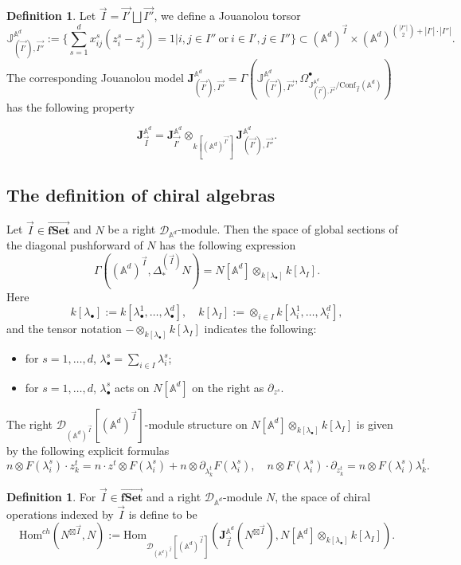 \documentclass[11pt]{amsart}
\theoremstyle{definition}
\newtheorem{defn}[thm]{Definition}
\theoremstyle{remark}
\numberwithin{equation}{section}
\begin{document}
\begin{defn}
Let $\vec{I}=\vec{I'}\bigsqcup\vec{I''}$, we define a Jouanolou torsor
$$
\mathbb{J}^{\mathbb{A}^d}_{(\vec{I'}),\vec{I''}}:=\{\sum_{s=1}^d x_{ij}^s(z^s_i-z^s_j)=1|i,j\in I''\ \text{or}\  i\in I', j\in I''\}\subset (\mathbb{A}^d)^{\vec{I}}\times (\mathbb{A}^d)^{\binom{|I''|}{2}+|I'|\cdot |I''|}.
$$
The corresponding Jouanolou model $\mathbf{J}^{\mathbb{A}^d}_{(\vec{I'}),\vec{I''}}=\Gamma(\mathbb{J}^{\mathbb{A}^d}_{(\vec{I'}),\vec{I''}},\Omega^{\bullet}_{\mathbb{J}^{\mathbb{A}^d}_{(\vec{I'}),\vec{I''}}/\mathrm{Conf}_{\vec{I}}(\mathbb{A}^d)})$ has the following property

$$
\mathbf{J}^{\mathbb{A}^d}_{\vec{I}}=\mathbf{J}^{\mathbb{A}^d}_{\vec{I'}}\otimes_{k[(\mathbb{A}^d)^{\vec{I'}}]} \mathbf{J}^{\mathbb{A}^d}_{(\vec{I'}),\vec{I''}}.
$$
\end{defn}

\subsection{The definition of chiral algebras}

Let $\vec{I}\in  \overrightarrow{\mathbf{fSet}}$ and $N$ be a right $\mathcal{D}_{\mathbb{A}^d}$-module. Then the space of global sections of the diagonal pushforward of $N$ has the following expression
$$
\Gamma\left((\mathbb{A}^d)^{\vec{I}},\Delta_*^{(\vec{I})}N\right)=N[\mathbb{A}^d]\otimes_{k[\lambda_{\bullet}]}k[\lambda_I].
$$
Here
$$
k[\lambda_{\bullet}]:=k[\lambda^1_{\bullet},\dots,\lambda^d_{\bullet}], \quad k[\lambda_{I}]:=\otimes_{{i\in I}}k[\lambda^1_{i},\dots,\lambda^d_{i}],
$$
and the tensor notation $-\otimes_{k[\lambda_{\bullet}]}k[\lambda_I]$ indicates the following:
\begin{itemize}
  \item for $s=1,\dots,d$, $\lambda^s_{\bullet}=\sum\limits_{i\in I}\lambda^s_i$;
  \item for $s=1,\dots,d$, $\lambda^s_{\bullet}$ acts on $N[\mathbb{A}^d]$ on the right as $\partial_{z^s}$.
\end{itemize}
The right $\mathcal{D}_{(\mathbb{A}^d)^{\vec{I}}}[(\mathbb{A}^d)^{\vec{I}}]$-module structure on $N[\mathbb{A}^d]\otimes_{k[\lambda_{\bullet}]}k[\lambda_I]$ is given by the following explicit formulas
$$
n\otimes F(\lambda^s_i)\cdot z^t_k=n \cdot z^t\otimes F(\lambda^s_i)+n\otimes \partial_{\lambda^t_k}F(\lambda^s_i),\quad n\otimes F(\lambda^s_i)\cdot \partial_{z^t_k}=n\otimes F(\lambda^s_i)\lambda^t_k.
$$

\begin{defn}
  For $\vec{I}\in \overrightarrow{\mathbf{fSet}}$ and a right $\mathcal{D}_{\mathbb{A}^d}$-module $N$, the space of chiral operations indexed by $\vec{I}$ is define to be
  $$
  \mathrm{Hom}^{ch}(N^{\boxtimes\vec{I}},N):=\mathrm{Hom}_{\mathcal{D}_{(\mathbb{A}^d)^{\vec{I}}}[(\mathbb{A}^d)^{\vec{I}}]}\left(\mathbf{J}^{\mathbb{A}^d}_{\vec{I}}(N^{\boxtimes\vec{I}}),N[\mathbb{A}^d]\otimes_{k[\lambda_{\bullet}]}k[\lambda_I]\right).
  $$
\end{defn}
\end{document}
